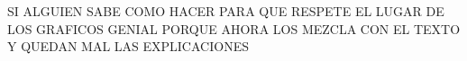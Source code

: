 



{\huge SI ALGUIEN SABE COMO HACER PARA QUE RESPETE EL LUGAR DE LOS GRAFICOS GENIAL PORQUE AHORA LOS MEZCLA CON EL TEXTO Y QUEDAN MAL LAS EXPLICACIONES
}\\


%
%
%
%
%
%
%
